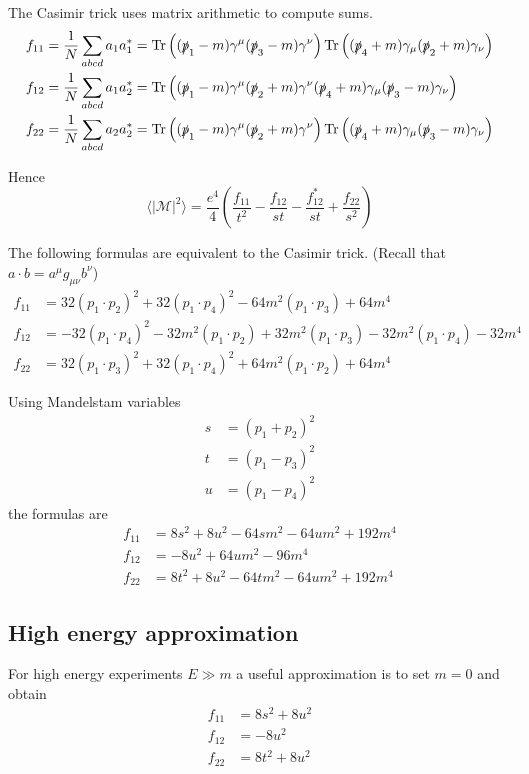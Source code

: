 \documentclass[12pt]{article}
\begin{document}
The Casimir trick uses matrix arithmetic to compute sums.
\begin{align*}
f_{11}&=\frac{1}{N}\sum_{abcd}a_1a_1^*=
\mathop{\rm Tr}\left(
(\slashed{p}_1-m)\gamma^\mu(\slashed{p}_3-m)\gamma^\nu
\right)
\mathop{\rm Tr}\left(
(\slashed{p}_4+m)\gamma_\mu(\slashed{p}_2+m)\gamma_\nu
\right)
\\
f_{12}&=\frac{1}{N}\sum_{abcd}a_1a_2^*=
\mathop{\rm Tr}\left(
(\slashed{p}_1-m)\gamma^\mu(\slashed{p}_2+m)\gamma^\nu
(\slashed{p}_4+m)\gamma_\mu(\slashed{p}_3-m)\gamma_\nu
\right)
\\
f_{22}&=\frac{1}{N}\sum_{abcd}a_2a_2^*=
\mathop{\rm Tr}\left(
(\slashed{p}_1-m)\gamma^\mu(\slashed{p}_2+m)\gamma^\nu
\right)
\mathop{\rm Tr}\left(
(\slashed{p}_4+m)\gamma_\mu(\slashed{p}_3-m)\gamma_\nu
\right)
\end{align*}

Hence
\begin{equation*}
\langle|\mathcal{M}|^2\rangle
=\frac{e^4}{4}
\left(
\frac{f_{11}}{t^2} - \frac{f_{12}}{st} -
\frac{f_{12}^*}{st} + \frac{f_{22}}{s^2}
\right)
\end{equation*}

The following formulas are equivalent to the Casimir trick.
(Recall that $a\cdot b=a^\mu g_{\mu\nu}b^\nu$)
\begin{align*}
f_{11}&=
32(p_1\cdot p_2)^2
+32(p_1\cdot p_4)^2
-64 m^2(p_1\cdot p_3)
+64 m^4
\\
f_{12}&=
-32 (p_1\cdot p_4)^2
-32 m^2 (p_1\cdot p_2)
+32 m^2 (p_1\cdot p_3)
-32 m^2 (p_1\cdot p_4)
-32 m^4
\\
f_{22}&=
32(p_1\cdot p_3)^2
+32(p_1\cdot p_4)^2
+64 m^2(p_1\cdot p_2)
+64 m^4
\end{align*}

Using Mandelstam variables
\begin{align*}
s&=(p_1+p_2)^2
\\
t&=(p_1-p_3)^2
\\
u&=(p_1-p_4)^2
\end{align*}
the formulas are
\begin{align*}
f_{11} &= 8 s^2 + 8 u^2 - 64 s m^2 - 64 u m^2 + 192 m^4
\\
f_{12} &= -8 u^2 + 64 u m^2 - 96 m^4
\\
f_{22} &= 8 t^2 + 8 u^2 - 64 t m^2 - 64 u m^2 + 192 m^4
\end{align*}

\subsection*{High energy approximation}
For high energy experiments $E\gg m$ a useful approximation is to set $m=0$ and obtain
\begin{align*}
f_{11}&= 8 s^2 + 8 u^2\\
f_{12}&= -8 u^2\\
f_{22}&= 8 t^2 + 8 u^2
\end{align*}
\end{document}
